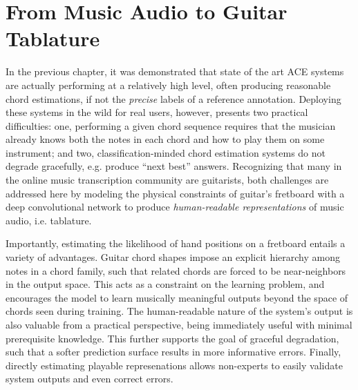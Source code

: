 


\graphicspath{{6/figures/}}

\chapter{From Music Audio to Guitar Tablature}
\label{chp:background}

In the previous chapter, it was demonstrated that state of the art ACE systems are actually performing at a relatively high level, often producing reasonable chord estimations, if not the \emph{precise} labels of a reference annotation.
Deploying these systems in the wild for real users, however, presents two practical difficulties:
one, performing a given chord sequence requires that the musician already knows both the notes in each chord and how to play them on some instrument;
and two, classification-minded chord estimation systems do not degrade gracefully, e.g. produce ``next best'' answers.
Recognizing that many in the online music transcription community are guitarists, both challenges are addressed here by modeling the physical constraints of guitar's fretboard with a deep convolutional network to produce \emph{human-readable representations} of music audio, i.e. tablature.

Importantly, estimating the likelihood of hand positions on a fretboard entails a variety of advantages.
Guitar chord shapes impose an explicit hierarchy among notes in a chord family, such that related chords are forced to be near-neighbors in the output space.
This acts as a constraint on the learning problem, and encourages the model to learn musically meaningful outputs beyond the space of chords seen during training.
The human-readable nature of the system's output is also valuable from a practical perspective, being immediately useful with minimal prerequisite knowledge.
This further supports the goal of graceful degradation, such that a softer prediction surface results in more informative errors.
Finally, directly estimating playable represenations allows non-experts to easily validate system outputs and even correct errors.



